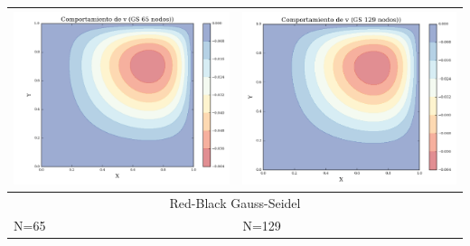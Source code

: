 \documentclass[letter,10pt]{article}
\begin{document}
\begin{table}[H]
\begin{tabular}{|l|l|}
\includegraphics[scale=0.4]{img/v_GS65N} & \includegraphics[scale=0.4]{img/v_GS129N} \\ \hline
\multicolumn{2}{|c|}{Red-Black Gauss-Seidel} \\ \hline
N=65 & N=129 \\ 

\end{tabular}
\end{table}
\end{document}
